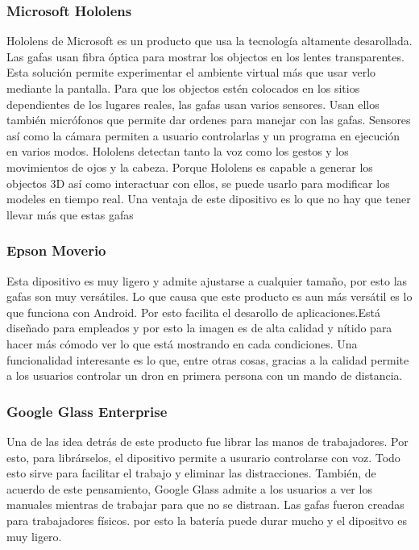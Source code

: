 \documentclass[a4paper,11pt]{scrartcl}
\begin{document}
\subsubsection{Microsoft Hololens}
Hololens de Microsoft es un producto que usa la tecnología altamente desarollada. Las gafas usan fibra óptica para mostrar los objectos en los lentes transparentes.
Esta solución permite experimentar el ambiente virtual más que usar verlo mediante la pantalla.
Para que los objectos estén colocados en los sitios dependientes de los lugares reales, las gafas usan varios sensores. Usan ellos también micrófonos que permite dar ordenes para manejar con las gafas. Sensores así como la cámara permiten a usuario controlarlas y un programa en ejecución en varios modos. Hololens detectan tanto la voz como los gestos y los movimientos de ojos y la cabeza. Porque Hololens es capable a generar los objectos 3D así como interactuar con ellos, se puede usarlo para modificar los modeles en tiempo real. Una ventaja de este dipositivo es lo que no hay que tener llevar más que estas gafas



\subsubsection{Epson Moverio}
Esta dipositivo es muy ligero y admite ajustarse a cualquier tamaño, por esto las gafas son muy versátiles. Lo que causa que este producto es aun más versátil es lo que funciona con Android. Por esto facilita el desarollo de aplicaciones.Está diseñado para empleados y por esto  la imagen es de alta calidad y nítido para hacer más cómodo ver lo que está mostrando en cada condiciones.
Una funcionalidad interesante es lo que, entre otras cosas, gracias a la calidad permite a los usuarios controlar un dron en primera persona con un mando de distancia.


\subsubsection{Google Glass Enterprise}
 Una de las idea detrás de este producto fue librar las manos de trabajadores. Por esto, para librárselos, el dipositivo permite a usurario controlarse con voz. Todo esto sirve para facilitar el trabajo y eliminar las distracciones. También, de acuerdo de este pensamiento, Google Glass admite a los usuarios a ver los manuales mientras de trabajar para que no se distraan. Las gafas fueron creadas para trabajadores físicos. por esto la batería puede durar mucho y el dipositvo es muy ligero.
\end{document}
